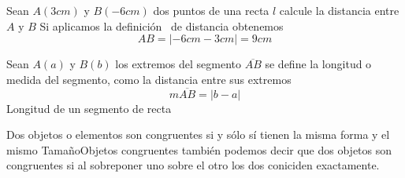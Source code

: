 \begin{ejemplo}{Sean $A\left( 3\unit{cm}\right) $ y $B\left( -6\unit{cm}\right) $ dos puntos
de una recta $l$ calcule la distancia entre $A$ y $B$}
\solucion Si aplicamos la definici\'{o}n \ de distancia obtenemos%
\begin{equation*}
AB=\left\vert -6\unit{cm}-3\unit{cm}\right\vert =9\unit{cm}
\end{equation*}
\end{ejemplo}
\begin{definicion}{Sean $A\left( a\right) $ y $B\left( b\right) $ los extremos del segmento $%
\overline{AB}$ se define la longitud o medida del segmento, como la distancia entre
sus extremos
\begin{equation*}
m\overline{AB}=\left\vert b-a\right\vert
\end{equation*}}{Longitud de un segmento de recta}
\end{definicion}
\begin{ideas}{Dos objetos o elementos son congruentes si y sólo sí
tienen la misma forma y el mismo Tamaño}{Objetos congruentes}
también podemos decir que dos objetos son congruentes si al sobreponer uno sobre el otro
los dos coniciden exactamente.
 \end{ideas}

